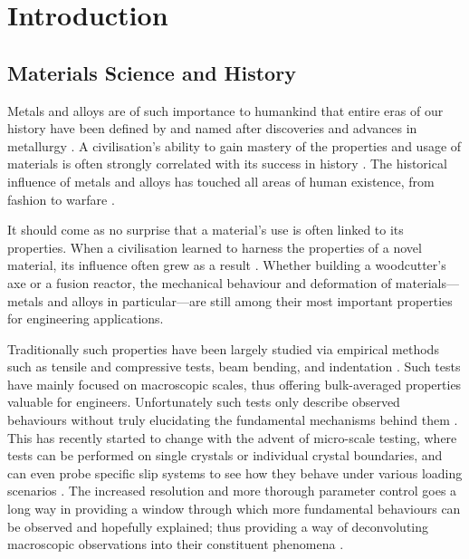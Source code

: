 \chapter{Introduction}
\label{c:intro}
\section{Materials Science and History}
\label{s:matsci_history}
Metals and alloys are of such importance to humankind that entire eras of our history have been defined by and named after discoveries and advances in metallurgy \cite{metals_prehistory1, metals_prehistory2}. A civilisation's ability to gain mastery of the properties and usage of materials is often strongly correlated with its success in history \cite{metals_success1}. The historical influence of metals and alloys has touched all areas of human existence, from fashion to warfare \cite{metals_social}.

It should come as no surprise that a material's use is often linked to its properties. When a civilisation learned to harness the properties of a novel material, its influence often grew as a result \cite{guns_germs_steel, metals_success2}. Whether building a woodcutter's axe or a fusion reactor, the mechanical behaviour and deformation of materials---metals and alloys in particular---are still among their most important properties for engineering applications.

Traditionally such properties have been largely studied via empirical methods such as tensile and compressive tests, beam bending, and indentation \cite{tensile_test_theory, bending_test_theory, indentation_theory}. Such tests have mainly focused on macroscopic scales, thus offering bulk-averaged properties valuable for engineers. Unfortunately such tests only describe observed behaviours without truly elucidating the fundamental mechanisms behind them \cite{micromech_test1}. This has recently started to change with the advent of micro-scale testing, where tests can be performed on single crystals or individual crystal boundaries, and can even probe specific slip systems to see how they behave under various loading scenarios \cite{micromech_test2, micromech_test3}. The increased resolution and more thorough parameter control goes a long way in providing a window through which more fundamental behaviours can be observed and hopefully explained; thus providing a way of deconvoluting macroscopic observations into their constituent phenomena \cite{micro_macro1, micro_macro2}.


